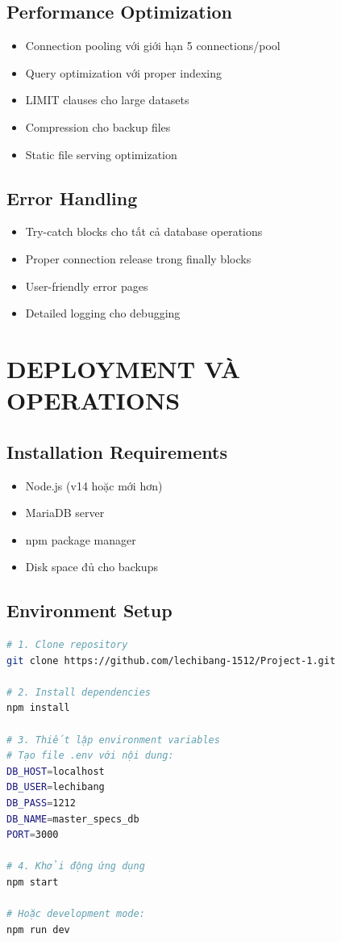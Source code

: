 \documentclass[12pt,a4paper]{article}
\begin{document}
\subsection{Performance Optimization}
\begin{itemize}
    \item Connection pooling với giới hạn 5 connections/pool
    \item Query optimization với proper indexing
    \item LIMIT clauses cho large datasets
    \item Compression cho backup files
    \item Static file serving optimization
\end{itemize}

\subsection{Error Handling}
\begin{itemize}
    \item Try-catch blocks cho tất cả database operations
    \item Proper connection release trong finally blocks
    \item User-friendly error pages
    \item Detailed logging cho debugging
\end{itemize}

\section{DEPLOYMENT VÀ OPERATIONS}

\subsection{Installation Requirements}
\begin{itemize}
    \item Node.js (v14 hoặc mới hơn)
    \item MariaDB server
    \item npm package manager
    \item Disk space đủ cho backups
\end{itemize}

\subsection{Environment Setup}
\begin{lstlisting}[language=bash, caption=Các bước cài đặt]
# 1. Clone repository
git clone https://github.com/lechibang-1512/Project-1.git

# 2. Install dependencies
npm install

# 3. Thiết lập environment variables
# Tạo file .env với nội dung:
DB_HOST=localhost
DB_USER=lechibang
DB_PASS=1212
DB_NAME=master_specs_db
PORT=3000

# 4. Khởi động ứng dụng
npm start

# Hoặc development mode:
npm run dev
\end{lstlisting}
\end{document}
